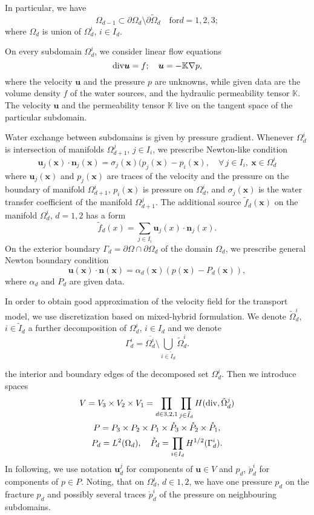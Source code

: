 \documentclass{elsart}
\def\div{{\rm div}}
\def\grad{\nabla}
\def\vc#1{\mathbf{\boldsymbol{#1}}}     %
\def\tn#1{{\mathbb{#1}}}    %
\def\close#1{\overline{#1}}
\def\prtl{\partial}                                        %
\def\vl{{\vc{u}}}
\begin{document}
In particular, we have 
\begin{equation}
  \Omega_{d-1} \subset \prtl\Omega_d \setminus \prtl\tilde\Omega_d \quad \text{for} d=1,2,3;
\end{equation}
where $\Omega_d$ is union of $\Omega_d^i$, $i\in I_d$.

On every subdomain $\Omega_d^i$, we consider linear flow equations
\begin{equation}
\label{flow_eq} 
   \div \vl= f;\quad  \vl=-\tn K \grad p,
\end{equation}
where the velocity $\vl$ and the pressure $p$ are unknowns, while given data are the volume density $f$ of the water sources,
and the hydraulic permeability tensor $\tn K$.
The velocity $\vl$ and the permeability tensor $\tn K$ live on the tangent space of the particular subdomain. 

Water exchange between subdomains is given by pressure gradient. Whenever $\Omega_d^i$ is intersection of manifolds
$\Omega_{d+1}^j$, $j\in I_i$, we prescribe Newton-like condition
\[
    \vl_j(\vc x)\cdot\vc n_j(\vc x) = \sigma_j(\vc x)(p_j(\vc x)-p_i(\vc x),\quad  \forall\, j\in I_i,\ \vc x\in\Omega_d^i
\]
where $\vl_j(\vc x)$ and $p_j(\vc x)$ are traces of the velocity and the pressure on the boundary of manifold $\Omega_{d+1}^i$, 
$p_i(\vc x)$ is pressure on $\Omega_d^i$, and $\sigma_j(\vc x)$ is the water transfer coefficient of the manifold $\Omega_{d+1}^j$. The additional source $\tilde f_d(\vc x)$ on the manifold $\Omega_d^i$, $d=1,2$ has a form
\[
  \tilde f_d(x)=\sum_{j\in I_i} \vl_j(x)\cdot\vc n_j(x).
\]
On the exterior boundary $\Gamma_d=\prtl\Omega \cap \prtl\Omega_d$ of the domain $\Omega_d$, we prescribe general Newton boundary condition
\[
   \vl(\vc x)\cdot\vc n(\vc x) = \alpha_d(\vc x)(p(\vc x)-P_d(\vc x)),
\]
where $\alpha_d$ and $P_d$ are given data.

In order to obtain good approximation of the velocity field for the transport model, we use discretization
based on mixed-hybrid formulation. We denote $\tilde\Omega_d^i$, $i\in \tilde I_d$ a further decomposition of
$\Omega_d^i$, $i\in I_d$ and we denote 
\[
\Gamma_d^i=\close{\Omega_d^i}\setminus\bigcup_{i\in\tilde I_d} \tilde\Omega_d^i.
\]

the interior and boundary edges of the decomposed set $\Omega_d^i$. Then we introduce spaces
\begin{gather}
    \label{Vspace}
        V=V_3\times V_2\times V_1=
                \prod_{d\in{3,2,1}} \prod_{j\in \tilde I_d} H(\div,\tilde\Omega_d^j)\\
    \label{Pspace}  
        P=P_3\times P_2\times P_1\times \mathring{P}_3\times \mathring{P}_2 \times \mathring{P}_1,\\
    \notag
        P_d=L^2(\Omega_d),\quad \mathring{P}_d=\prod_{i\in I_d}H^{1/2}(\Gamma_d^i).
\end{gather}
In following, we use notation $\vl_d^j$ for components of $\vl\in V$ and $p_d$, $\mathring{p}_d^i$ for components of $p\in P$. Noting, that on $\Omega_d^i$, $d\in 1,2$, we have one pressure $p_d$ on the fracture $p_d$ and possibly several traces $\mathring{p}_d^i$ of the pressure on neighbouring subdomains. 
\end{document}
